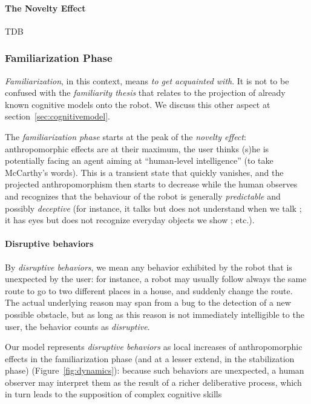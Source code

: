\documentclass{frontiersSCNS} %
\begin{document}
\paragraph{The Novelty Effect}
\label{sec:noveltyeffect}

TDB

\subsubsection{Familiarization Phase}
\label{sec:familiarization}

\emph{Familiarization}, in this context, means \emph{to get acquainted with}.
It is not to be confused with the \emph{familiarity thesis} that relates to the
projection of already known cognitive models onto the robot. We discuss this other
aspect at section~\ref{sec:cognitivemodel}.

The \emph{familiarization phase} starts at the peak of the \emph{novelty
effect}: anthropomorphic effects are at their maximum, the user thinks (s)he is
potentially facing an agent aiming at ``human-level intelligence'' (to take
McCarthy's words). This is a transient state that quickly vanishes, and the
projected anthropomorphism then starts to decrease while the human observes and
recognizes that the behaviour of the robot is generally \emph{predictable} and
possibly \emph{deceptive} (for instance, it talks but does not understand when
we talk ; it has eyes but does not recognize everyday objects we show ; etc.).

\paragraph{Disruptive behaviors}

By \emph{disruptive behaviors}, we mean any behavior exhibited by the robot
that is unexpected by the user: for instance, a robot may usually follow always
the same route to go to two different places in a house, and suddenly change
the route. The actual underlying reason may span from a bug to the detection of
a new possible obstacle, but as long as this reason is not immediately
intelligible to the user, the behavior counts as \emph{disruptive}.

Our model represents \emph{disruptive behaviors} as local increases of
anthropomorphic effects in the familiarization phase (and at a lesser extend,
in the stabilization phase) (Figure~\ref{fig:dynamics}): because such behaviors
are unexpected, a human observer may interpret them as the result of a richer
deliberative process, which in turn leads to the supposition of complex
cognitive skills
\end{document}
